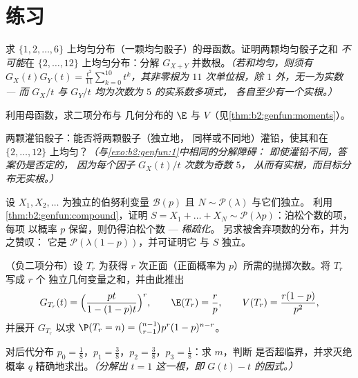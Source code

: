 \section{练习}

\begin{exercise}[$\star$]\label{exo:b2:genfun:1}
求 $\{1, 2,
\dots, 6\}$ 上均匀分布（一颗均匀骰子）的母函数。证明两颗均匀骰子之和
\emph{不可能}在 $\{2, \dots, 12\}$ 上均匀分布：分解 $G_{X+Y}$
并数根。\emph{（若和均匀，则须有 $G_X(t)G_Y(t) =
\frac{t^2}{11}\sum_{k=0}^{10}t^k$，其非零根为
$11$ 次单位根，除 $1$ 外，无一为实数 ---
而 $G_X/t$ 与 $G_Y/t$ 均为次数为 $5$ 的实系数多项式，
各自至少有一个实根。）}
\end{exercise}

\begin{exercise}[$\star$]\label{exo:b2:genfun:2}
利用母函数，求二项分布与
几何分布的 $\E$ 与 $V$（见\cref{thm:b2:genfun:moments}）。
\end{exercise}

\begin{exercise}[$\star$]\label{exo:b2:genfun:3}
两颗灌铅骰子：能否将两颗骰子（独立地，
同样或不同地）灌铅，使其和在 $\{2, \dots,
12\}$ 上均匀？\emph{（与\cref{exo:b2:genfun:1}中相同的分解障碍：
即使灌铅不同，答案仍是否定的，
因为每个因子 $G_X(t)/t$ 次数为奇数 $5$，
从而有实根，而目标分布无实根。）}
\end{exercise}

\begin{exercise}[$\star\star$]\label{exo:b2:genfun:4}
设 $X_1, X_2, \dots$ 为独立的伯努利变量 $\mathcal{B}(p)$
且 $N \sim \mathcal{P}(\lambda)$ 与它们独立。
利用\cref{thm:b2:genfun:compound}，证明 $S = X_1 + \dots + X_N
\sim \mathcal{P}(\lambda p)$：泊松个数的项，每项
以概率 $p$ 保留，则仍得泊松个数 --- \emph{稀疏化}。
另求被舍弃项数的分布，并为之赞叹：
它是 $\mathcal{P}(\lambda(1-p))$，并可证明它
与 $S$ 独立。
\end{exercise}

\begin{exercise}[$\star\star$]\label{exo:b2:genfun:5}
（负二项分布）设 $T_r$ 为获得
$r$ 次正面（正面概率为 $p$）所需的抛掷次数。将 $T_r$ 写成 $r$ 个
独立几何变量之和，并由此推出
\[
G_{T_r}(t) = \Bigl(\frac{pt}{1 - (1-p)t}\Bigr)^{r},
\qquad
\E(T_r) = \frac rp,
\qquad
V(T_r) = \frac{r(1-p)}{p^2},
\]
并展开 $G_{T_r}$ 以求 $\P(T_r = n) = \binom{n-1}{r-1}
p^r(1-p)^{n-r}$。
\end{exercise}

\begin{exercise}[$\star\star$]\label{exo:b2:genfun:6}
对后代分布 $p_0 = \frac18$，$p_1 = \frac38$，$p_2 =
\frac38$，$p_3 = \frac18$：求 $m$，判断
是否超临界，并求灭绝概率 $q$
精确地求出。\emph{（分解出 $t = 1$ 这一根，即 $G(t) - t$ 的因式。）}
\end{exercise}

